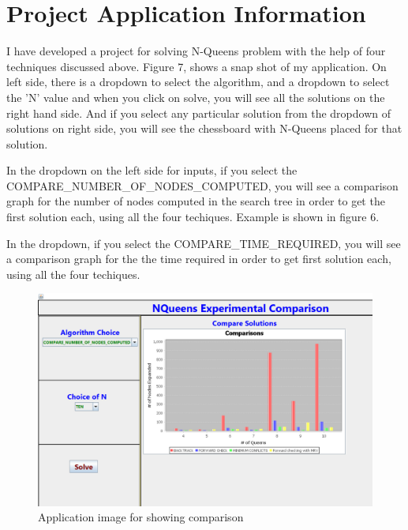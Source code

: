 \documentclass[conference]{IEEEtran}
\begin{document}

%
%
%

\section{Project Application Information}

I have developed a project for solving N-Queens problem with the help of four techniques discussed above.
Figure 7, shows a snap shot of my application. On left side, there is a dropdown to select the algorithm, and a dropdown to select the 'N' value and when you click on solve, you will see all the solutions on the right hand side. And if you select any particular solution from the dropdown of solutions on right side, you will see the chessboard with N-Queens placed for that solution.

\par In the dropdown on the left side for inputs, if you select the COMPARE\_NUMBER\_OF\_NODES\_COMPUTED, you will see a comparison graph for the number of nodes computed in the search tree in order to get the first solution each, using all the four techiques. Example is shown in figure 6.

\par  In the dropdown, if you select the COMPARE\_TIME\_REQUIRED, you will see a comparison graph for the the time required in order to get first solution each, using all the four techiques.


\begin{figure}
\includegraphics[scale=0.27]{N10nodesComputedComparison.png}
\caption{Application image for showing comparison}
\label{Figure9}
\end{figure}
\end{document}
